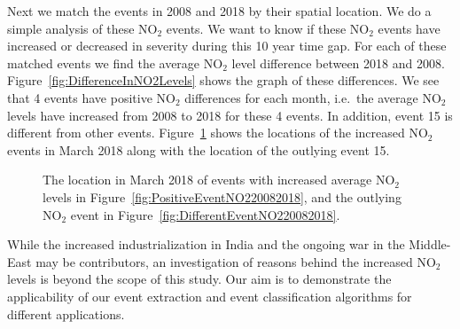 \documentclass[a4paper,11pt]{article}
\begin{document}
Next we match the events in 2008 and 2018 by their spatial location. We do a simple analysis of these $\text{NO}_2$ events. We want to know if these $\text{NO}_2$ events have increased or decreased in severity during this 10 year time gap. For each of these matched events we find the average $\text{NO}_2$ level difference between 2018 and 2008. Figure~\ref{fig:DifferenceInNO2Levels} shows the graph of these differences. We see that 4 events have positive $\text{NO}_2$ differences for each month, i.e.\ the average $\text{NO}_2$ levels have increased from 2008 to 2018 for these 4 events. In addition, event 15 is different from other events. Figure~\ref{fig:PositiveDifferentEventsNO220082018} shows the locations of the increased $\text{NO}_2$ events in March 2018 along with the location of the outlying event 15.

\begin{figure}
	\centering
	\caption{The location in March 2018 of events with increased average $\text{NO}_2$ levels in Figure~\ref{fig:PositiveEventNO220082018}, and the outlying $\text{NO}_2$ event in Figure~\ref{fig:DifferentEventNO220082018}.}
	\label{fig:PositiveDifferentEventsNO220082018}
\end{figure}

While the increased industrialization in India and the ongoing war in the Middle-East  may be contributors, an investigation of reasons behind the increased $\text{NO}_2$ levels is beyond the scope of this study. Our aim is to demonstrate the applicability of our event extraction and event classification algorithms for different applications.
\end{document}
